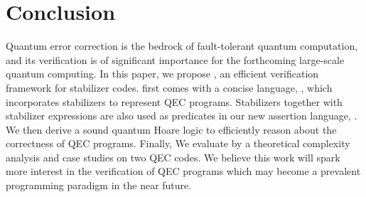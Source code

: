 
\section{Conclusion}

Quantum error correction is the bedrock of fault-tolerant quantum computation, and its verification 
is of significant importance for the forthcoming large-scale quantum computing.
In this paper, we propose {\myFrameworkName}, an efficient verification framework for stabilizer codes. 
 {\myFrameworkName} first comes with a concise language, {\langname}, which incorporates  stabilizers to represent QEC programs.
Stabilizers together with stabilizer expressions are also used as predicates in our new assertion language, {\assnname}. 
We then derive a sound quantum Hoare logic to efficiently reason about the correctness of QEC programs.
Finally, We evaluate  {\myFrameworkName} by a theoretical complexity analysis and case studies on two QEC codes.
We believe this work will spark more interest in the verification of QEC programs which may become a prevalent programming paradigm in the near future.
